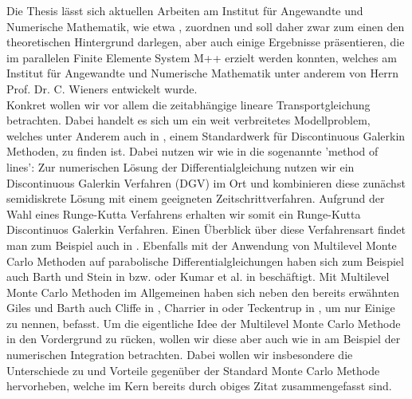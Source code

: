 Die Thesis lässt sich aktuellen Arbeiten am Institut für Angewandte und Numerische Mathematik, wie etwa \cite{BAUMGARTEN2020}, zuordnen und soll daher zwar zum einen den theoretischen Hintergrund darlegen, aber auch einige Ergebnisse präsentieren, die im parallelen Finite Elemente System M++ \cite{siteM++} erzielt werden konnten, welches am Institut für Angewandte und Numerische Mathematik unter anderem von Herrn Prof. Dr. C. Wieners entwickelt wurde. \\
Konkret wollen wir vor allem die zeitabhängige lineare Transportgleichung betrachten. Dabei handelt es sich um ein weit verbreitetes Modellproblem, welches unter Anderem auch in \cite{di2011mathematical}, einem Standardwerk für Discontinuous Galerkin Methoden, zu finden ist. 
Dabei nutzen wir wie in \cite{di2011mathematical} die sogenannte 'method of lines': Zur numerischen Lösung der Differentialgleichung nutzen wir ein Discontinuous Galerkin Verfahren (DGV) im Ort und kombinieren diese zunächst semidiskrete Lösung mit einem geeigneten Zeitschrittverfahren. Aufgrund der Wahl eines Runge-Kutta Verfahrens erhalten wir somit ein Runge-Kutta Discontinuos Galerkin Verfahren. Einen Überblick über diese Verfahrensart findet man zum Beispiel auch in \cite{cockburn2001runge}.
Ebenfalls mit der Anwendung von Multilevel Monte Carlo Methoden auf parabolische Differentialgleichungen haben sich zum Beispiel auch Barth und Stein in \cite{barth2013multilevel} bzw. \cite{barth2019multilevel} oder Kumar et al. in \cite{kumar2018multigrid} beschäftigt. Mit Multilevel Monte Carlo Methoden im Allgemeinen haben sich neben den bereits erwähnten Giles und Barth auch Cliffe in \cite{cliffe2011multilevel}, Charrier in \cite{charrier2012strong} oder Teckentrup in \cite{teckentrup2013further}, um nur Einige zu nennen, befasst.
Um die eigentliche Idee der Multilevel Monte Carlo Methode in den Vordergrund zu rücken, wollen wir diese aber auch wie in \cite{heinrich2001multilevel} am Beispiel der numerischen Integration betrachten.
Dabei wollen wir insbesondere die Unterschiede zu und Vorteile gegenüber der Standard Monte Carlo Methode hervorheben, welche im Kern bereits durch obiges Zitat zusammengefasst sind.

